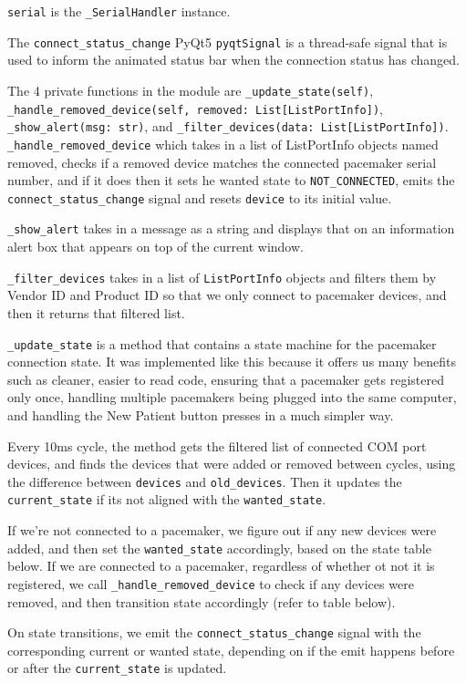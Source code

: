 \documentclass[12pt]{article}
\begin{document}
\verb|serial| is the \verb|_SerialHandler| instance.

The \verb|connect_status_change| PyQt5 \verb|pyqtSignal| is a thread-safe signal that is used to inform the animated status bar when the connection status has changed.

The 4 private functions in the module are \verb|_update_state(self)|, \verb|_handle_removed_device(self, removed: List[ListPortInfo])|, \verb|_show_alert(msg: str)|, and \verb|_filter_devices(data: List[ListPortInfo])|.
\verb|_handle_removed_device| which takes in a list of ListPortInfo objects named removed, checks if a removed device matches the connected pacemaker serial number, and if it does then it sets he wanted state to \verb|NOT_CONNECTED|, emits the \verb|connect_status_change| signal and resets \verb|device| to its initial value.

\verb|_show_alert| takes in a message as a string and displays that on an information alert box that appears on top of the current window.

\verb|_filter_devices| takes in a list of \verb|ListPortInfo| objects and filters them by Vendor ID and Product ID so that we only connect to pacemaker devices, and then it returns that filtered list.

\verb|_update_state| is a method that contains a state machine for the pacemaker connection state.
It was implemented like this because it offers us many benefits such as cleaner, easier to read code, ensuring that a pacemaker gets registered only once, handling multiple pacemakers being plugged into the same computer, and handling the New Patient button presses in a much simpler way.

Every 10ms cycle, the method gets the filtered list of connected COM port devices, and finds the devices that were added or removed between cycles, using the difference between \verb|devices| and \verb|old_devices|.
Then it updates the \verb|current_state| if its not aligned with the \verb|wanted_state|.

If we're not connected to a pacemaker, we figure out if any new devices were added, and then set the \verb|wanted_state| accordingly, based on the state table below.
If we are connected to a pacemaker, regardless of whether ot not it is registered, we call \verb|_handle_removed_device| to check if any devices were removed, and then transition state accordingly (refer to table below).

On state transitions, we emit the \verb|connect_status_change| signal with the corresponding current or wanted state, depending on if the emit happens before or after the \verb|current_state| is updated.
\end{document}
